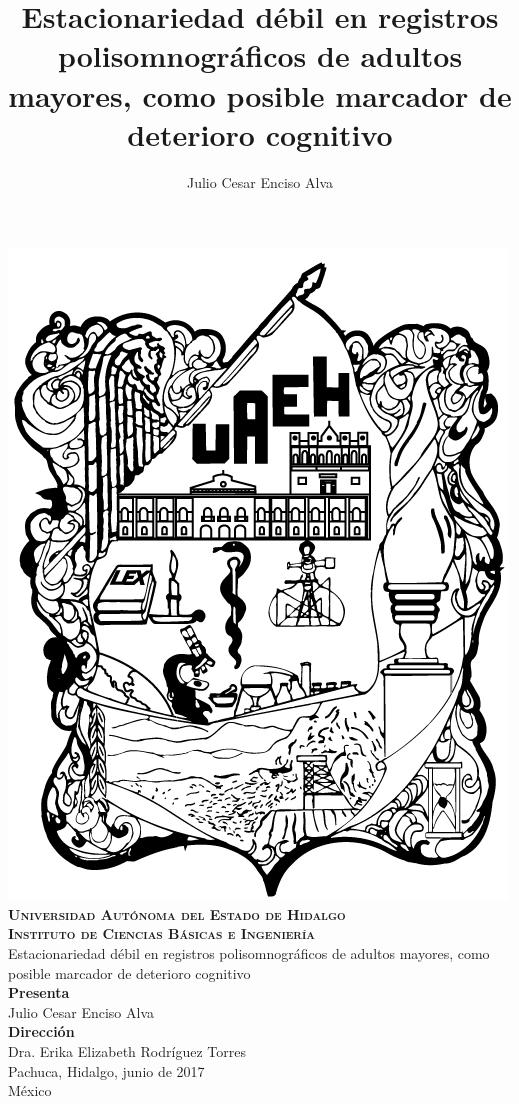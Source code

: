 \documentclass[12pt,a4paper]{mitthesis}
\begin{document}
\setcounter{page}{0}
\thispagestyle{empty}

\title{Estacionariedad d\'ebil en registros polisomnogr\'aficos de adultos mayores,
como posible marcador de deterioro cognitivo}
\author{Julio Cesar Enciso Alva}

{

\begin{center}
\includegraphics[width=0.2\linewidth]{./img_oficiales/logo_uaeh.png}\\
{\Large \textbf{ \textsc{
Universidad Aut\'onoma del Estado de Hidalgo\\
Instituto de Ciencias B\'asicas e Ingenier\'ia\\
}}
\vspace*{3.5em}
}
{\huge
Estacionariedad d\'ebil en registros polisomnogr\'aficos de adultos mayores,
como posible marcador de deterioro cognitivo\\
\vspace*{2.5em}
}
{\large
\textbf{Presenta}\\
\vspace*{.25em}}
{\Large
Julio Cesar Enciso Alva\\
\vspace*{4em}
}
{\large
\textbf{Direcci\'on}\\
\vspace*{.25em}}
{\Large
Dra. Erika Elizabeth Rodr\'iguez Torres\\
\vspace*{4em}
}
{\large
Pachuca, Hidalgo, junio de 2017\\
M\'exico
}

\end{center}
}

\newpage

\end{document}
